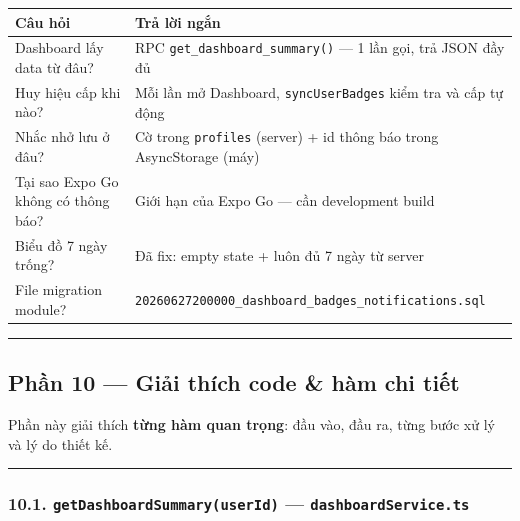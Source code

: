 \documentclass[12pt,a4paper]{article}
\begin{document}
{\def\LTcaptype{none} %
\begin{longtable}[]{@{}
  >{\raggedright\arraybackslash}p{}
  >{\raggedright\arraybackslash}p{}@{}}
\toprule\noalign{}
\begin{minipage}[b]{\linewidth}\raggedright
Câu hỏi
\end{minipage} & \begin{minipage}[b]{\linewidth}\raggedright
Trả lời ngắn
\end{minipage} \\
\midrule\noalign{}
\endhead
\bottomrule\noalign{}
\endlastfoot
Dashboard lấy data từ đâu? & RPC \texttt{get\_dashboard\_summary()} ---
1 lần gọi, trả JSON đầy đủ \\
Huy hiệu cấp khi nào? & Mỗi lần mở Dashboard, \texttt{syncUserBadges}
kiểm tra và cấp tự động \\
Nhắc nhở lưu ở đâu? & Cờ trong \texttt{profiles} (server) + id thông báo
trong AsyncStorage (máy) \\
Tại sao Expo Go không có thông báo? & Giới hạn của Expo Go --- cần
development build \\
Biểu đồ 7 ngày trống? & Đã fix: empty state + luôn đủ 7 ngày từ
server \\
File migration module? &
\texttt{20260627200000\_dashboard\_badges\_notifications.sql} \\
\end{longtable}
}

\begin{center}\rule{0.5\linewidth}{0.5pt}\end{center}

\subsection{Phần 10 --- Giải thích code \& hàm chi
tiết}\label{phux1ea7n-10-giux1ea3i-thuxedch-code-huxe0m-chi-tiux1ebft}

Phần này giải thích \textbf{từng hàm quan trọng}: đầu vào, đầu ra, từng
bước xử lý và lý do thiết kế.

\begin{center}\rule{0.5\linewidth}{0.5pt}\end{center}

\subsubsection{\texorpdfstring{10.1.
\texttt{getDashboardSummary(userId)} ---
\texttt{dashboardService.ts}}{10.1. getDashboardSummary(userId) --- dashboardService.ts}}\label{getdashboardsummaryuserid-dashboardservice.ts}
\end{document}
